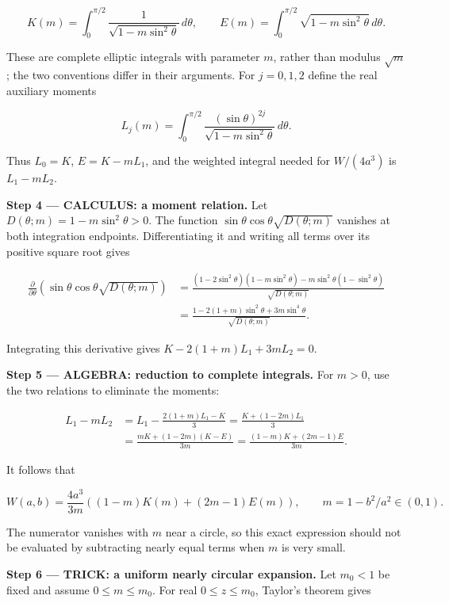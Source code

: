 \documentclass[11pt,oneside,openany]{book}
\begin{document}
\[
K(m)=\int_0^{\pi/2}\frac{1}{\sqrt{1-m\sin^2\theta}}\,d\theta,
\qquad
E(m)=\int_0^{\pi/2}\sqrt{1-m\sin^2\theta}\,d\theta.
\]

These are complete elliptic integrals with parameter \(m\), rather than modulus \(\sqrt m\); the two conventions differ in their arguments. For \(j=0,1,2\) define the real auxiliary moments

\[
L_j(m)=\int_0^{\pi/2}\frac{(\sin\theta)^{2j}}{\sqrt{1-m\sin^2\theta}}\,d\theta.
\]

Thus \(L_0=K\), \(E=K-mL_1\), and the weighted integral needed for \(W/(4a^3)\) is \(L_1-mL_2\).

\textbf{Step 4 --- CALCULUS: a moment relation.} Let \(D(\theta;m)=1-m\sin^2\theta>0\). The function \(\sin\theta\cos\theta\sqrt{D(\theta;m)}\) vanishes at both integration endpoints. Differentiating it and writing all terms over its positive square root gives

\[
\begin{aligned}
\frac{\partial}{\partial\theta}
\left(\sin\theta\cos\theta\sqrt{D(\theta;m)}\right)
&=\frac{(1-2\sin^2\theta)(1-m\sin^2\theta)
-m\sin^2\theta(1-\sin^2\theta)}{\sqrt{D(\theta;m)}}\\
&=\frac{1-2(1+m)\sin^2\theta+3m\sin^4\theta}{\sqrt{D(\theta;m)}}.
\end{aligned}
\]

Integrating this derivative gives \(K-2(1+m)L_1+3mL_2=0\).

\begingroup\color{AlgebraBlue}
\textbf{Step 5 --- ALGEBRA: reduction to complete integrals.} For \(m>0\), use the two relations to eliminate the moments:

\[
\begin{aligned}
L_1-mL_2
&=L_1-\frac{2(1+m)L_1-K}{3}
=\frac{K+(1-2m)L_1}{3}\\
&=\frac{mK+(1-2m)(K-E)}{3m}
=\frac{(1-m)K+(2m-1)E}{3m}.
\end{aligned}
\]

It follows that

\[
W(a,b)=\frac{4a^3}{3m}\left((1-m)K(m)+(2m-1)E(m)\right),
\qquad m=1-b^2/a^2\in(0,1).
\]

The numerator vanishes with \(m\) near a circle, so this exact expression should not be evaluated by subtracting nearly equal terms when \(m\) is very small.

\endgroup
\begingroup\color{TrickPurple}
\textbf{Step 6 --- TRICK: a uniform nearly circular expansion.} Let \(m_0<1\) be fixed and assume \(0\le m\le m_0\). For real \(0\le z\le m_0\), Taylor's theorem gives
\end{document}
